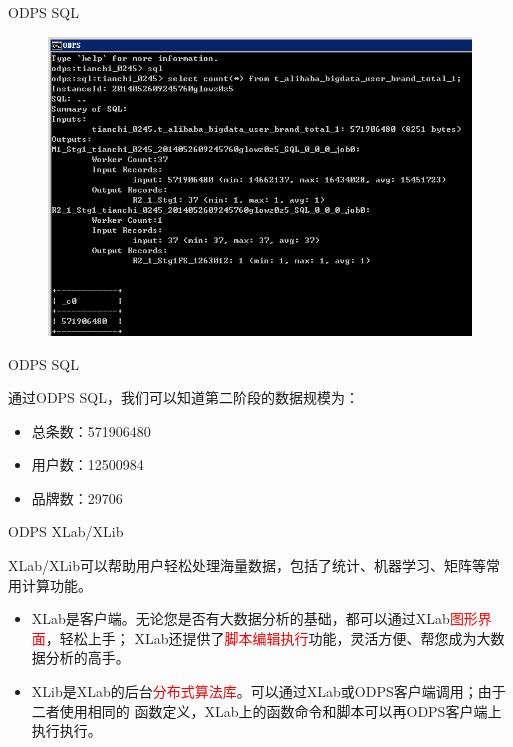 \documentclass{beamer}
\begin{document}
\begin{frame}{ODPS SQL}

\begin{figure}
\includegraphics[width=0.9\linewidth]{./odps_query}
\end{figure}

\end{frame}

\begin{frame}{ODPS SQL}

通过ODPS SQL，我们可以知道第二阶段的数据规模为：

\begin{itemize}
\item 总条数：571906480
\item 用户数：12500984
\item 品牌数：29706 
\end{itemize}

\end{frame}

\begin{frame}{ODPS XLab/XLib}

XLab/XLib可以帮助用户轻松处理海量数据，包括了统计、机器学习、矩阵等常用计算功能。

\begin{itemize}
\item XLab是客户端。无论您是否有大数据分析的基础，都可以通过XLab\textcolor{red}{图形界面}，轻松上手；
XLab还提供了\textcolor{red}{脚本编辑执行}功能，灵活方便、帮您成为大数据分析的高手。
\item XLib是XLab的后台\textcolor{red}{分布式算法库}。可以通过XLab或ODPS客户端调用；由于二者使用相同的
函数定义，XLab上的函数命令和脚本可以再ODPS客户端上执行执行。
\end{itemize}

\end{frame}
\end{document}
